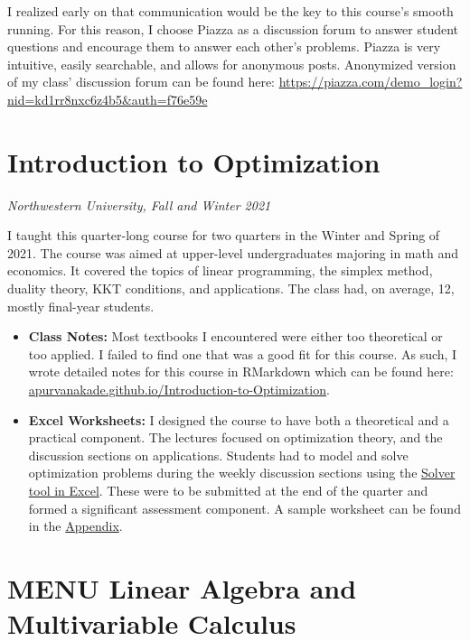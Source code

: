 \documentclass[
]{report}
\begin{document}
\begin{itemize}
  I realized early on that communication would be the key to this course's smooth running.
  For this reason, I choose Piazza as a discussion forum to answer student questions and encourage them to answer each other's problems.
  Piazza is very intuitive, easily searchable, and allows for anonymous posts.
  Anonymized version of my class' discussion forum can be found here: \url{https://piazza.com/demo_login?nid=kd1rr8nxc6z4b5\&auth=f76e59e}
\end{itemize}

\hypertarget{introduction-to-optimization}{%
\section{Introduction to Optimization}\label{introduction-to-optimization}}

\emph{Northwestern University, Fall and Winter 2021}

I taught this quarter-long course for two quarters in the Winter and Spring of 2021.
The course was aimed at upper-level undergraduates majoring in math and economics.
It covered the topics of linear programming, the simplex method, duality theory, KKT conditions, and applications.
The class had, on average, 12, mostly final-year students.

\begin{itemize}
\item
  \textbf{Class Notes:}
  Most textbooks I encountered were either too theoretical or too applied.
  I failed to find one that was a good fit for this course.
  As such, I wrote detailed notes for this course in RMarkdown which can be found here: \href{https://apurvanakade.github.io/Introduction-to-Optimization/}{apurvanakade.github.io/Introduction-to-Optimization}.
\item
  \textbf{Excel Worksheets:}
  I designed the course to have both a theoretical and a practical component.
  The lectures focused on optimization theory, and the discussion sections on applications.
  Students had to model and solve optimization problems during the weekly discussion sections using the \href{https://support.microsoft.com/en-us/office/load-the-solver-add-in-in-excel-612926fc-d53b-46b4-872c-e24772f078ca}{Solver tool in Excel}.
  These were to be submitted at the end of the quarter and formed a significant assessment component.
  A sample worksheet can be found in the \protect\hyperlink{sample-worksheet}{Appendix}.
\end{itemize}

\hypertarget{menu-linear-algebra-and-multivariable-calculus}{%
\section{MENU Linear Algebra and Multivariable Calculus}\label{menu-linear-algebra-and-multivariable-calculus}}
\end{document}
